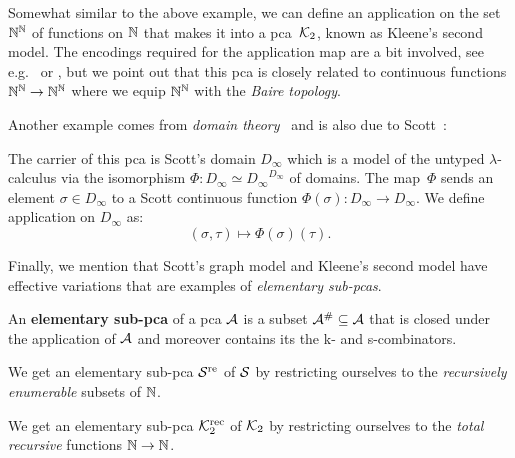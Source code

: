 \cite{KleeneVesley1965}
\begin{example}
  Somewhat similar to the above example, we can define an application on the set
  \(\Nat^\Nat\) of functions on \(\Nat\) that makes it into a pca~\(\Ktwo\),
  known as Kleene's second model.
  The encodings required for the application map are a bit involved, see
  e.g.~\cite[p.~30 and Section~2.1.2]{Bauer2023} or
  \cite[Section~1.4.3]{vanOosten2008}, but we point out that this pca is closely
  related to continuous functions \(\Nat^\Nat \to \Nat^\Nat\) where we equip
  \(\Nat^\Nat\) with the \emph{Baire topology}.
\end{example}

Another example comes from \emph{domain theory}~\cite{AmadioCurien1998} and is
also due to Scott~\cite{Scott1972}:
\begin{example}
  The carrier of this pca is Scott's domain \(D_\infty\) which is a model of the
  untyped \(\lambda\)-calculus via the isomorphism
  \(\Phi \colon D_\infty \simeq {D_\infty}^{D_\infty}\) of domains.
  The map~\(\Phi\) sends an element \(\sigma \in D_\infty\) to a Scott
  continuous function \(\Phi(\sigma) \colon D_\infty \to D_\infty\).
  We define application on \(D_\infty\) as:
  \[
    (\sigma,\tau) \mapsto \Phi(\sigma)(\tau).
  \]
\end{example}

Finally, we mention that Scott's graph model and Kleene's second model have
effective variations that are examples of \emph{elementary sub-pcas}.

\begin{definition}
  An \textbf{elementary sub-pca} of a pca \(\AA\) is a subset
  \(\AA^\# \subseteq \AA\) that is closed under the application of \(\AA\) and
  moreover contains its the k- and s-combinators.
\end{definition}

\begin{example}
  We get an elementary sub-pca \(\Scottre\) of \(\Scott\) by restricting
  ourselves to the \emph{recursively enumerable} subsets of \(\Nat\).
\end{example}

\begin{example}
  We get an elementary sub-pca \(\Ktworec\) of \(\Ktwo\) by restricting
  ourselves to the \emph{total recursive} functions \(\Nat \to \Nat\).
\end{example}

